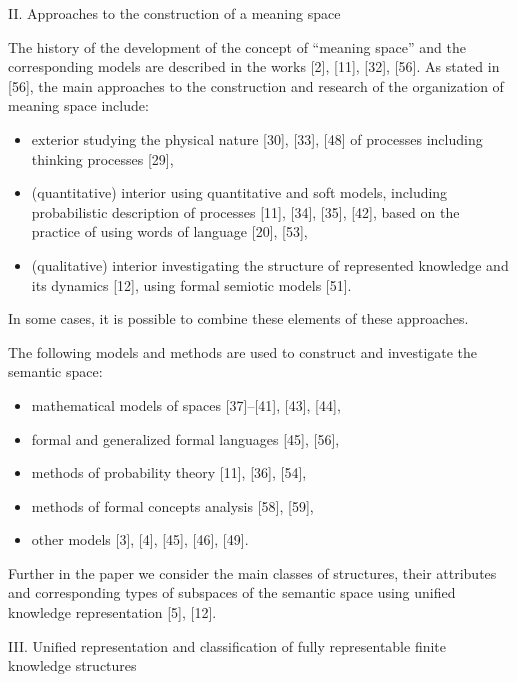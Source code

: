 \begin{multicols}{2}
\begin{center}
  \big II. Approaches to the construction of a meaning space
\end{center}
The history of the development of the concept of
“meaning space” and the corresponding models are described in the works [2], [11], [32], [56].\columnbreak
As stated in [56], the main approaches to the construction and research of the organization of meaning space
include:
\begin{itemize}[noitemsep]
    \item exterior studying the physical nature [30], [33], [48]
of processes including thinking processes [29],
    \item  (quantitative) interior using quantitative and soft
models, including probabilistic description of processes [11], [34], [35], [42], based on the practice
of using words of language [20], [53],
     \item (qualitative) interior investigating the structure of
represented knowledge and its dynamics [12], using
formal semiotic models [51].
\end{itemize}
In some cases, it is possible to combine these elements
of these approaches.
\par The following models and methods are used to construct and investigate the semantic space:
\begin{itemize}[noitemsep]
    \item  mathematical models of spaces [37]–[41], [43],
[44],
    \item   formal and generalized formal languages [45], [56],
     \item  methods of probability theory [11], [36], [54],
   \item methods of formal concepts analysis [58], [59],
   \item other models [3], [4], [45], [46], [49].

\end{itemize}
Further in the paper we consider the main classes of
structures, their attributes and corresponding types of
subspaces of the semantic space using unified knowledge
representation [5], [12].
\begin{center}
 \big III. Unified representation and classification of fully
representable finite knowledge structures 
\end{center}


\end{multicols}
